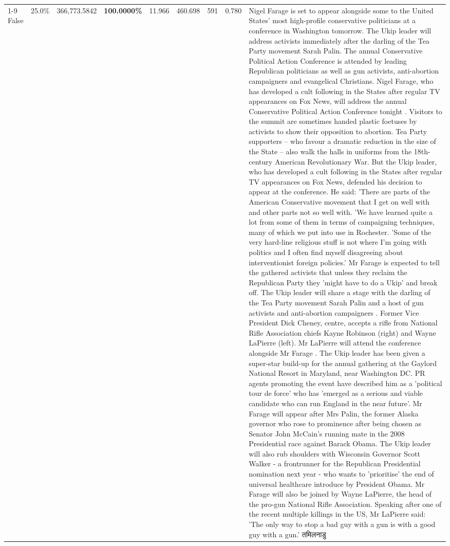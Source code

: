 \begin{table}[H]
\begin{tabular}{lllrlllll}
\cline{1-9}
False & 25.0\% & 366,773.5842 & \bfseries \color{red} 100.0000\% & 11.966 & 460.698 & 591 & 0.780 & Nigel Farage is set to appear alongside some to the United States' most high-profile conservative politicians at a conference in Washington tomorrow. The Ukip leader will address activists immediately after the darling of the Tea Party movement Sarah Palin. The annual Conservative Political Action Conference is attended by leading Republican politicians as well as gun activists, anti-abortion campaigners and evangelical Christians. Nigel Farage, who has developed a cult following in the States after regular TV appearances on Fox News, will address the annual Conservative Political Action Conference tonight . Visitors to the summit are sometimes handed plastic foetuses by activists to show their opposition to abortion. Tea Party supporters – who favour a dramatic reduction in the size of the State – also walk the halls in uniforms from the 18th-century American Revolutionary War. But the Ukip leader, who has developed a cult following in the States after regular TV appearances on Fox News, defended his decision to appear at the conference. He said: 'There are parts of the American Conservative movement that I get on well with and other parts not so well with. 'We have learned quite a lot from some of them in terms of campaigning techniques, many of which we put into use in Rochester. 'Some of the very hard-line religious stuff is not where I'm going with politics and I often find myself disagreeing about interventionist foreign policies.' Mr Farage is expected to tell the gathered activists that unless they reclaim the Republican Party they 'might have to do a Ukip' and break off. The Ukip leader will share a stage with the darling of the Tea Party movement Sarah Palin and a host of gun activists and anti-abortion campaigners . Former Vice President Dick Cheney, centre, accepts a rifle from National Rifle Association chiefs Kayne Robinson (right) and Wayne LaPierre (left). Mr LaPierre will attend the conference alongside Mr Farage . The Ukip leader has been given a super-star build-up for the annual gathering at the Gaylord National Resort in Maryland, near Washington DC. PR agents promoting the event have described him as a 'political tour de force' who has 'emerged as a serious and viable candidate who can run England in the near future'. Mr Farage will appear after Mrs Palin, the former Alaska governor who rose to prominence after being chosen as Senator John McCain's running mate in the 2008 Presidential race against Barack Obama. The Ukip leader will also rub shoulders with Wisconsin Governor Scott Walker - a frontrunner for the Republican Presidential nomination next year - who wants to 'prioritise' the end of universal healthcare introduce by President Obama. Mr Farage will also be joined by Wayne LaPierre, the head of the pro-gun National Rifle Association. Speaking after one of the recent multiple killings in the US, Mr LaPierre said: 'The only way to stop a bad guy with a gun is with a good guy with a gun.' तमिलनाडु \\

\end{tabular}
\end{table}
